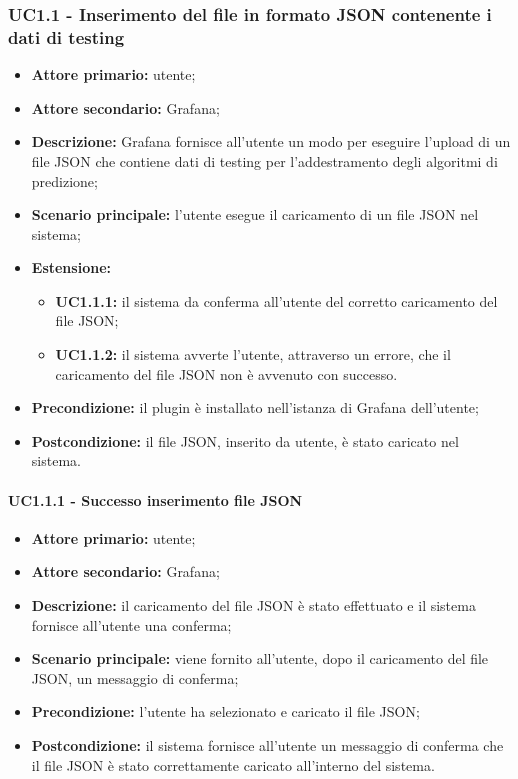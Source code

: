 \documentclass{article}
\begin{document}
	\subsubsection{UC1.1 - Inserimento del file in formato JSON contenente i dati di testing}
	\begin{itemize}
		\item \textbf{Attore primario:} utente;
		\item \textbf{Attore secondario:} Grafana;
		\item \textbf{Descrizione:} Grafana fornisce all'utente un modo per eseguire l'upload di un file JSON che contiene dati di testing per l'addestramento degli algoritmi di predizione;
		\item \textbf{Scenario principale:} l'utente esegue il caricamento di un file JSON nel sistema;
		\item \textbf{Estensione:}
			\begin{itemize}
				\item \textbf{UC1.1.1:} il sistema da conferma all'utente del corretto caricamento del file JSON;
				\item \textbf{UC1.1.2:} il sistema avverte l'utente, attraverso un errore, che il caricamento del file JSON non è avvenuto con successo.
			\end{itemize}
		\item \textbf{Precondizione:} il plugin è installato nell'istanza di Grafana dell'utente;
		\item \textbf{Postcondizione:} il file JSON, inserito da utente, è stato caricato nel sistema.
	\end{itemize}

	\paragraph{UC1.1.1 - Successo inserimento file JSON}
	\begin{itemize}
		\item \textbf{Attore primario:} utente;
		\item \textbf{Attore secondario:} Grafana;
		\item \textbf{Descrizione:} il caricamento del file JSON è stato effettuato e il sistema fornisce all'utente una conferma;
		\item \textbf{Scenario principale:} viene fornito all'utente, dopo il caricamento del file JSON, un messaggio di conferma;
		\item \textbf{Precondizione:} l'utente ha selezionato e caricato il file JSON;
		\item \textbf{Postcondizione:} il sistema fornisce all'utente un messaggio di conferma che il file JSON è stato correttamente caricato all'interno del sistema.
	\end{itemize}
\end{document}
